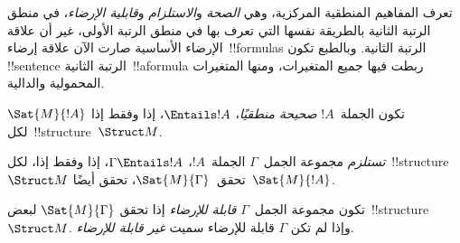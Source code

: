 \documentclass[../../../include/open-logic-section]{subfiles}
\begin{document}

\begin{explain}
تعرف المفاهيم المنطقية المركزية، وهي \emph{الصحة} و\emph{الاستلزام}
و\emph{قابلية الإرضاء}، في منطق الرتبة الثانية بالطريقة نفسها التي
تعرف بها في منطق الرتبة الأولى، غير أن علاقة الإرضاء الأساسية صارت
الآن علاقة إرضاء~!!{formula}s الرتبة الثانية. وبالطبع تكون
!!{sentence} الرتبة الثانية~!!a{formula} ربطت فيها جميع المتغيرات،
ومنها المتغيرات المحمولية والدالية.
\end{explain}

\begin{defn}[الصحة]
تكون الجملة~$!A$ \emph{صحيحة منطقيًا}، $\Entails !A$، إذا وفقط إذا
$\Sat{M}{!A}$ لكل~!!{structure}~$\Struct M$.
\end{defn}

\begin{defn}[الاستلزام]
\emph{تستلزم} مجموعة الجمل~$\Gamma$ الجملة~$!A$،
$\Gamma \Entails !A$، إذا وفقط إذا، لكل~!!{structure}~$\Struct M$
تحقق~$\Sat{M}{\Gamma}$، تحقق أيضًا~$\Sat{M}{!A}$.
\end{defn}

\begin{defn}
تكون مجموعة الجمل~$\Gamma$ \emph{قابلة للإرضاء} إذا تحقق
$\Sat{M}{\Gamma}$ لبعض~!!{structure}~$\Struct M$. وإذا لم تكن
$\Gamma$ قابلة للإرضاء سميت \emph{غير قابلة للإرضاء}.
\end{defn}
\end{document}
